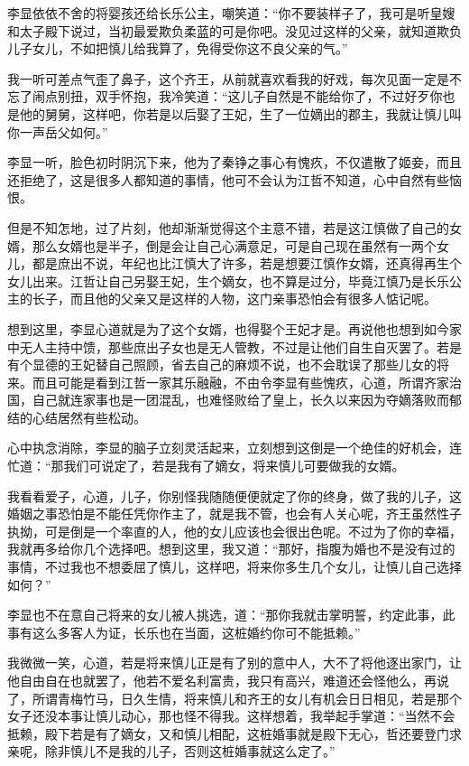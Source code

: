 李显依依不舍的将婴孩还给长乐公主，嘲笑道：“你不要装样子了，我可是听皇嫂和太子殿下说过，当初最爱欺负柔蓝的可是你吧。没见过这样的父亲，就知道欺负儿子女儿，不如把慎儿给我算了，免得受你这不良父亲的气。”

我一听可差点气歪了鼻子，这个齐王，从前就喜欢看我的好戏，每次见面一定是不忘了闹点别扭，双手怀抱，我冷笑道：“这儿子自然是不能给你了，不过好歹你也是他的舅舅，这样吧，你若是以后娶了王妃，生了一位嫡出的郡主，我就让慎儿叫你一声岳父如何。”

李显一听，脸色初时阴沉下来，他为了秦铮之事心有愧疚，不仅遣散了姬妾，而且还拒绝了，这是很多人都知道的事情，他可不会认为江哲不知道，心中自然有些恼恨。

但是不知怎地，过了片刻，他却渐渐觉得这个主意不错，若是这江慎做了自己的女婿，那么女婿也是半子，倒是会让自己心满意足，可是自己现在虽然有一两个女儿，都是庶出不说，年纪也比江慎大了许多，若是想要江慎作女婿，还真得再生个女儿出来。江哲让自己另娶王妃，生个嫡女，也不算是过分，毕竟江慎乃是长乐公主的长子，而且他的父亲又是这样的人物，这门亲事恐怕会有很多人惦记呢。

想到这里，李显心道就是为了这个女婿，也得娶个王妃才是。再说他也想到如今家中无人主持中馈，那些庶出子女也是无人管教，不过是让他们自生自灭罢了。若是有个显德的王妃替自己照顾，省去自己的麻烦不说，也不会耽误了那些儿女的将来。而且可能是看到江哲一家其乐融融，不由令李显有些愧疚，心道，所谓齐家治国，自己就连家事也是一团混乱，也难怪败给了皇上，长久以来因为夺嫡落败而郁结的心结居然有些松动。

心中执念消除，李显的脑子立刻灵活起来，立刻想到这倒是一个绝佳的好机会，连忙道：“那我们可说定了，若是我有了嫡女，将来慎儿可要做我的女婿。

我看看爱子，心道，儿子，你别怪我随随便便就定了你的终身，做了我的儿子，这婚姻之事恐怕是不能任凭你作主了，就是我不管，也会有人关心呢，齐王虽然性子执拗，可是倒是一个率直的人，他的女儿应该也会很出色呢。不过为了你的幸福，我就再多给你几个选择吧。想到这里，我又道：“那好，指腹为婚也不是没有过的事情，不过我也不想委屈了慎儿，这样吧，将来你多生几个女儿，让慎儿自己选择如何？”

李显也不在意自己将来的女儿被人挑选，道：“那你我就击掌明誓，约定此事，此事有这么多客人为证，长乐也在当面，这桩婚约你可不能抵赖。”

我微微一笑，心道，若是将来慎儿正是有了别的意中人，大不了将他逐出家门，让他自由自在也就罢了，他若不爱名利富贵，我只有高兴，难道还会怪他么，再说了，所谓青梅竹马，日久生情，将来慎儿和齐王的女儿有机会日日相见，若是那个女子还没本事让慎儿动心，那也怪不得我。这样想着，我举起手掌道：“当然不会抵赖，殿下若是有了嫡女，又和慎儿相配，这桩婚事就是殿下无心，哲还要登门求亲呢，除非慎儿不是我的儿子，否则这桩婚事就这么定了。”

